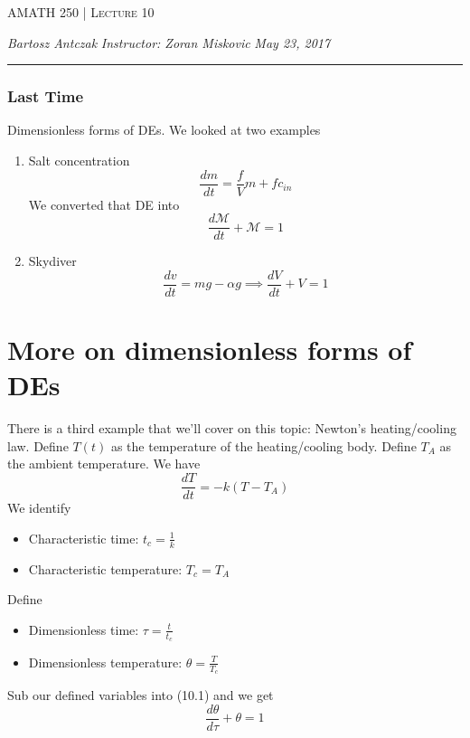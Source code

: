 \documentclass{report}
\newcommand{\lectureNum}{10}
\newcommand{\curDate}{May 23, 2017}
\newcommand{\course}{AMATH 250}
\newcommand{\instructor}{Zoran Miskovic}
\begin{document}
\begin{center}
\begin{Large}
\textsc{\course{} | Lecture \lectureNum{}}
\end{Large}
\end{center} 
\noindent \textit{Bartosz Antczak} \hfill
\textit{Instructor: \instructor{}} \hfill
\textit{\curDate{}}
\rule{\textwidth}{0.4pt}
\subsubsection{Last Time}
Dimensionless forms of DEs. We looked at two examples
\begin{enumerate}
\item Salt concentration$$\frac{dm}{dt} = \frac{f}{V}m + fc_{in}$$
We converted that DE into 
$$\frac{d\mathcal{M}}{dt} + \mathcal{M} = 1$$
\item Skydiver
$$\frac{dv}{dt} = mg - \alpha g \implies \frac{dV}{dt} + V = 1$$
\end{enumerate}
\section{More on dimensionless forms of DEs}
There is a third example that we'll cover on this topic: Newton's heating/cooling law. Define $T(t)$ as the temperature of the heating/cooling body. Define $T_A$ as the ambient temperature. We have
\begin{equation}
\frac{dT}{dt} = -k(T - T_A)
\end{equation}
We identify
\begin{itemize}
\item Characteristic time: $t_c = \frac{1}{k}$
\item Characteristic temperature: $T_c = T_A$
\end{itemize}
Define
\begin{itemize}
\item Dimensionless time: $\tau = \frac{t}{t_c}$
\item Dimensionless temperature: $\theta = \frac{T}{T_c}$
\end{itemize}
Sub our defined variables into (10.1) and we get
$$\frac{d\theta}{d\tau} + \theta = 1$$
\end{document}
